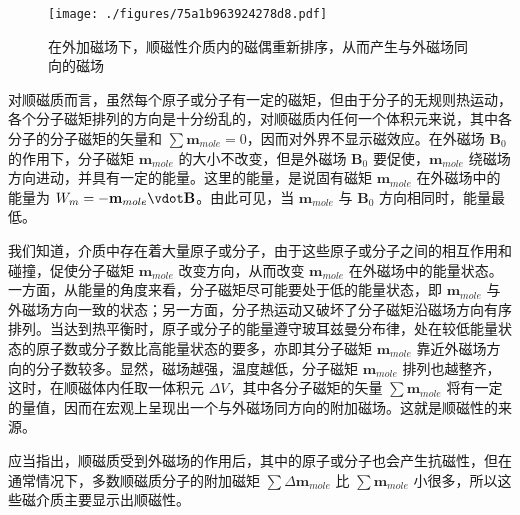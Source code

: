 
\begin{figure}[ht]
\centering
\texttt{[image: ./figures/75a1b963924278d8.pdf]}
\caption{在外加磁场下，顺磁性介质内的磁偶重新排序，从而产生与外磁场同向的磁场} \label{fig_ParaMa_1}
\end{figure}

对顺磁质而言，虽然每个原子或分子有一定的磁矩，但由于分子的无规则热运动，各个分子磁矩排列的方向是十分纷乱的，对顺磁质内任何一个体积元来说，其中各分子的分子磁矩的矢量和 $\sum \mathbf{m}_{mole}=0$，因而对外界不显示磁效应。在外磁场 $\mathbf B_0$ 的作用下，分子磁矩 $\mathbf{m}_{mole}$ 的大小不改变，但是外磁场 $\mathbf B_0$ 要促使，$\mathbf{m}_{mole}$ 绕磁场方向进动，并具有一定的能量。这里的能量，是说固有磁矩 $\mathbf m_{mole}$ 在外磁场中的能量为 $W_m=-\mathbf m_{mole} \vdot \mathbf B$。由此可见，当 $\mathbf m_{mole}$ 与 $\mathbf B_0$ 方向相同时，能量最低。

我们知道，介质中存在着大量原子或分子，由于这些原子或分子之间的相互作用和碰撞，促使分子磁矩 $\mathbf m_{mole}$ 改变方向，从而改变 $\mathbf m_{mole}$ 在外磁场中的能量状态。一方面，从能量的角度来看，分子磁矩尽可能要处于低的能量状态，即 $\mathbf m_{mole}$ 与外磁场方向一致的状态；另一方面，分子热运动又破坏了分子磁矩沿磁场方向有序排列。当达到热平衡时，原子或分子的能量遵守玻耳兹曼分布律，处在较低能量状态的原子数或分子数比高能量状态的要多，亦即其分子磁矩 $\mathbf m_{mole}$ 靠近外磁场方向的分子数较多。显然，磁场越强，温度越低，分子磁矩 $\mathbf m_{mole}$ 排列也越整齐，这时，在顺磁体内任取一体积元 $\Delta V$，其中各分子磁矩的矢量 $\sum \mathbf m_{mole}$ 将有一定的量值，因而在宏观上呈现出一个与外磁场同方向的附加磁场。这就是顺磁性的来源。

应当指出，顺磁质受到外磁场的作用后，其中的原子或分子也会产生抗磁性，但在通常情况下，多数顺磁质分子的附加磁矩 $\sum \Delta\mathbf m_{mole}$ 比 $\sum \mathbf m_{mole}$ 小很多，所以这些磁介质主要显示出顺磁性。